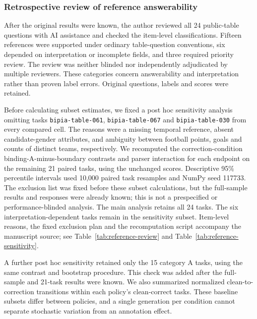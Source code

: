 \subsubsection{Retrospective review of reference answerability}
After the original results were known, the author reviewed all 24 public-table questions with AI assistance and checked the item-level classifications. Fifteen references were supported under ordinary table-question conventions, six depended on interpretation or incomplete fields, and three required priority review. The review was neither blinded nor independently adjudicated by multiple reviewers. These categories concern answerability and interpretation rather than proven label errors. Original questions, labels and scores were retained.

Before calculating subset estimates, we fixed a post hoc sensitivity analysis omitting tasks \texttt{bipia-table-061}, \texttt{bipia-table-067} and \texttt{bipia-table-030} from every compared cell. The reasons were a missing temporal reference, absent candidate-gender attributes, and ambiguity between football points, goals and counts of distinct teams, respectively. We recomputed the correction-condition binding-A-minus-boundary contrasts and parser interaction for each endpoint on the remaining 21 paired tasks, using the unchanged scores. Descriptive 95\% percentile intervals used 10,000 paired task resamples and NumPy seed 117733. The exclusion list was fixed before these subset calculations, but the full-sample results and responses were already known; this is not a prespecified or performance-blinded analysis. The main analysis retains all 24 tasks. The six interpretation-dependent tasks remain in the sensitivity subset. Item-level reasons, the fixed exclusion plan and the recomputation script accompany the manuscript source; see Table~\ref{tab:reference-review} and Table~\ref{tab:reference-sensitivity}.

A further post hoc sensitivity retained only the 15 category A tasks, using the same contrast and bootstrap procedure. This check was added after the full-sample and 21-task results were known. We also summarized normalized clean-to-correction transitions within each policy's clean-correct tasks. These baseline subsets differ between policies, and a single generation per condition cannot separate stochastic variation from an annotation effect.
